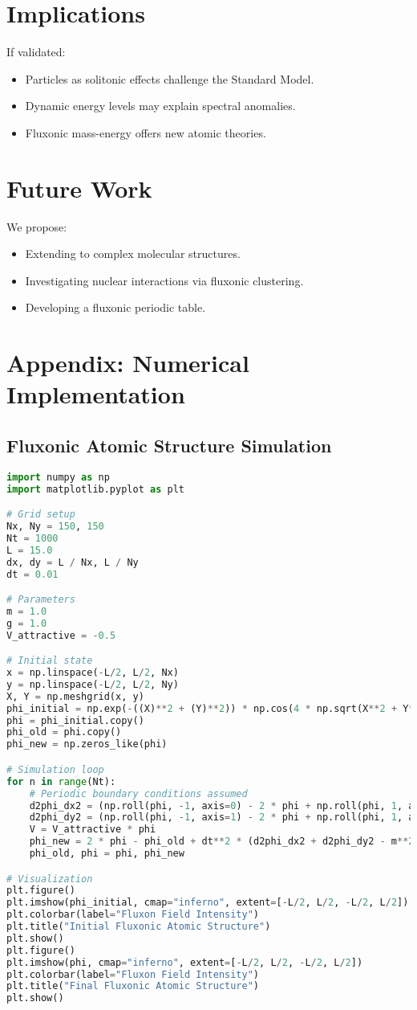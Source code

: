 \documentclass{article}
\begin{document}
\section{Implications}
If validated:
\begin{itemize}
    \item Particles as solitonic effects challenge the Standard Model.
    \item Dynamic energy levels may explain spectral anomalies.
    \item Fluxonic mass-energy offers new atomic theories.
\end{itemize}

\section{Future Work}
We propose:
\begin{itemize}
    \item Extending to complex molecular structures.
    \item Investigating nuclear interactions via fluxonic clustering.
    \item Developing a fluxonic periodic table.
\end{itemize}

\section{Appendix: Numerical Implementation}
\subsection{Fluxonic Atomic Structure Simulation}
\begin{lstlisting}[language=Python, caption=Fluxonic Atomic Structure Simulation, label=lst:atomic]
import numpy as np
import matplotlib.pyplot as plt

# Grid setup
Nx, Ny = 150, 150
Nt = 1000
L = 15.0
dx, dy = L / Nx, L / Ny
dt = 0.01

# Parameters
m = 1.0
g = 1.0
V_attractive = -0.5

# Initial state
x = np.linspace(-L/2, L/2, Nx)
y = np.linspace(-L/2, L/2, Ny)
X, Y = np.meshgrid(x, y)
phi_initial = np.exp(-((X)**2 + (Y)**2)) * np.cos(4 * np.sqrt(X**2 + Y**2))
phi = phi_initial.copy()
phi_old = phi.copy()
phi_new = np.zeros_like(phi)

# Simulation loop
for n in range(Nt):
    # Periodic boundary conditions assumed
    d2phi_dx2 = (np.roll(phi, -1, axis=0) - 2 * phi + np.roll(phi, 1, axis=0)) / dx**2
    d2phi_dy2 = (np.roll(phi, -1, axis=1) - 2 * phi + np.roll(phi, 1, axis=1)) / dy**2
    V = V_attractive * phi
    phi_new = 2 * phi - phi_old + dt**2 * (d2phi_dx2 + d2phi_dy2 - m**2 * phi - g * phi**3 + V)
    phi_old, phi = phi, phi_new

# Visualization
plt.figure()
plt.imshow(phi_initial, cmap="inferno", extent=[-L/2, L/2, -L/2, L/2])
plt.colorbar(label="Fluxon Field Intensity")
plt.title("Initial Fluxonic Atomic Structure")
plt.show()
plt.figure()
plt.imshow(phi, cmap="inferno", extent=[-L/2, L/2, -L/2, L/2])
plt.colorbar(label="Fluxon Field Intensity")
plt.title("Final Fluxonic Atomic Structure")
plt.show()
\end{lstlisting}
\end{document}
